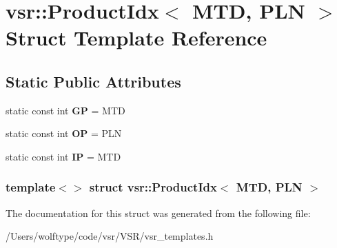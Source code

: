 \hypertarget{structvsr_1_1_product_idx_3_01_m_t_d_00_01_p_l_n_01_4}{\section{vsr\-:\-:Product\-Idx$<$ M\-T\-D, P\-L\-N $>$ Struct Template Reference}
\label{structvsr_1_1_product_idx_3_01_m_t_d_00_01_p_l_n_01_4}
}
\subsection*{Static Public Attributes}
\begin{DoxyCompactItemize}
\item 
\hypertarget{structvsr_1_1_product_idx_3_01_m_t_d_00_01_p_l_n_01_4_a50c1ee71c05bec6ee534670c52ec423b}{static const int {\bfseries G\-P} = M\-T\-D}\label{structvsr_1_1_product_idx_3_01_m_t_d_00_01_p_l_n_01_4_a50c1ee71c05bec6ee534670c52ec423b}

\item 
\hypertarget{structvsr_1_1_product_idx_3_01_m_t_d_00_01_p_l_n_01_4_a1af9d35c2408cdb985ba588d72da2ab1}{static const int {\bfseries O\-P} = P\-L\-N}\label{structvsr_1_1_product_idx_3_01_m_t_d_00_01_p_l_n_01_4_a1af9d35c2408cdb985ba588d72da2ab1}

\item 
\hypertarget{structvsr_1_1_product_idx_3_01_m_t_d_00_01_p_l_n_01_4_a42cca4cf71a0e85e25da3dfd77e2bbab}{static const int {\bfseries I\-P} = M\-T\-D}\label{structvsr_1_1_product_idx_3_01_m_t_d_00_01_p_l_n_01_4_a42cca4cf71a0e85e25da3dfd77e2bbab}

\end{DoxyCompactItemize}
\subsubsection*{template$<$$>$ struct vsr\-::\-Product\-Idx$<$ M\-T\-D, P\-L\-N $>$}



The documentation for this struct was generated from the following file\-:\begin{DoxyCompactItemize}
\item 
/\-Users/wolftype/code/vsr/\-V\-S\-R/vsr\-\_\-templates.\-h\end{DoxyCompactItemize}
